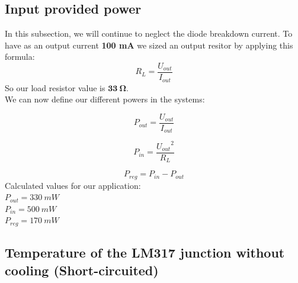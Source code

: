 \subsection{Input provided power} \label{ssec:num03}
{
In this subsection, we will continue to neglect the diode breakdown current. To have as an output current \textbf{100 mA} we sized an output resitor by applying this formula:
\begin{equation}
    R_L = \frac{U_{out}}{I_{out}}
\end{equation}
So our load resistor value is $ \mathbf{ 33 \ \boldsymbol{\Omega} } $. \\
\clearpage
We can now define our different powers in the systems:

\begin{equation}
    P_{out} = \frac{U_{out}}{I_{out}}
\end{equation}

\begin{equation}
    P_{in} = \frac{{U_{out}}^2}{R_{L}}
\end{equation}

\begin{equation}
    P_{reg} = P_{in} - P_{out}
\end{equation}
Calculated values for our application:\\
$ P_{out} = 330 \ mW $ \\
$ P_{in} = 500 \ mW $ \\
$ P_{reg} = 170 \ mW $ \\

}

\subsection{Temperature of the LM317 junction without cooling (Short-circuited)} \label{ssec:num05}
{


}

\newpage

